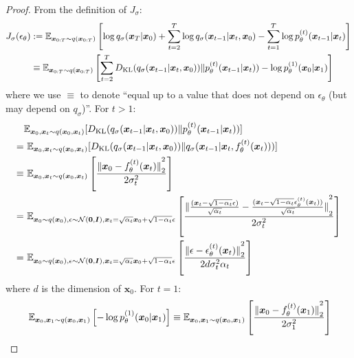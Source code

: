 \unifiedklobj*

\begin{proof}
From the definition of $J_\sigma$:
\begin{align}
   J_\sigma(\epsilon_\theta) & := {\mathbb{E}}_{\bm{x}_{0:T} \sim q(\bm{x}_{0:T})} \left[\log q_\sigma(\bm{x}_T | \bm{x}_0) + \sum_{t=2}^{T} \log q_\sigma(\bm{x}_{t-1} | \bm{x}_t, \bm{x}_0) - \sum_{t=1}^{T} \log p_\theta^{(t)}(\bm{x}_{t-1} | \bm{x}_t) \right] \\
   & \equiv {\mathbb{E}}_{\bm{x}_{0:T} \sim q(\bm{x}_{0:T})} \left[\sum_{t=2}^{T} D_{\mathrm{KL}}(q_\sigma(\bm{x}_{t-1} | \bm{x}_t, \bm{x}_0)) \Vert p_\theta^{(t)}(\bm{x}_{t-1} | \bm{x}_t)) - \log p_\theta^{(1)}(\bm{x}_0 | \bm{x}_1)  \right] \nonumber
\end{align}
where we use $\equiv$ to denote ``equal up to a value that does not depend on $\epsilon_\theta$ (but may depend on $q_\sigma$)''. For $t > 1$:
\begin{align}
   & {\mathbb{E}}_{\bm{x}_{0}, \bm{x}_t \sim q(\bm{x}_{0}, \bm{x}_t)} [D_{\mathrm{KL}}(q_\sigma(\bm{x}_{t-1} | \bm{x}_t, \bm{x}_0)) \Vert p_\theta^{(t)}(\bm{x}_{t-1} | \bm{x}_t))] \nonumber \\
   = & \ {\mathbb{E}}_{\bm{x}_{0}, \bm{x}_t \sim q(\bm{x}_{0}, \bm{x}_t)}[D_{\mathrm{KL}}(q_\sigma(\bm{x}_{t-1} | \bm{x}_t, \bm{x}_0)) \Vert q_\sigma(\bm{x}_{t-1} | \bm{x}_t, f_{\theta}^{(t)}(\bm{x}_t)))] \nonumber \\
   \equiv & \ {\mathbb{E}}_{\bm{x}_{0}, \bm{x}_t \sim q(\bm{x}_{0}, \bm{x}_t)}\left[\frac{{\lVert {\bm{x}_0 - f_{\theta}^{(t)}(\bm{x}_t)} \rVert}_2^2}{2 \sigma_t^2}\right] \\
   = & \ {\mathbb{E}}_{\bm{x}_{0} \sim q(\bm{x}_{0}), \epsilon \sim \mathcal{N}({\bm{0}}, \bm{I}), \bm{x}_t = \sqrt{\alpha_t} \bm{x}_0 + \sqrt{1 - \alpha_t} \epsilon}\left[\frac{{\lVert {\frac{{(\bm{x}_t - \sqrt{1 - \alpha_t} \epsilon)}}{\sqrt{\alpha_t}} - \frac{(\bm{x}_t - \sqrt{1 - \alpha_t} \epsilon_{\theta}^{(t)}(\bm{x}_t))}{\sqrt{\alpha_t}}} \rVert}_2^2}{2 \sigma_t^2}\right] \\
   = & \ {\mathbb{E}}_{\bm{x}_{0} \sim q(\bm{x}_{0}), \epsilon \sim \mathcal{N}({\bm{0}}, \bm{I}), \bm{x}_t = \sqrt{\alpha_t} \bm{x}_0 + \sqrt{1 - \alpha_t} \epsilon}\left[\frac{{\lVert {\epsilon - \epsilon_{\theta}^{(t)}(\bm{x}_t)} \rVert}_2^2}{2 d \sigma_t^2 \alpha_t}\right]
\end{align}
where $d$ is the dimension of $\bm{x}_0$. For $t = 1$:
\begin{align}
   & \ \bb{E}_{\bm{x}_{0}, \bm{x}_1 \sim q(\bm{x}_{0}, \bm{x}_1)} \left[ - \log p_\theta^{(1)}(\bm{x}_0 | \bm{x}_1)  \right] \equiv \bb{E}_{\bm{x}_{0}, \bm{x}_1 \sim q(\bm{x}_{0}, \bm{x}_1)}\left[\frac{\norm{\bm{x}_0 - f_{\theta}^{(t)}(\bm{x}_1)}_2^2}{2 \sigma_1^2}\right] \\

\end{align}
\end{proof}
